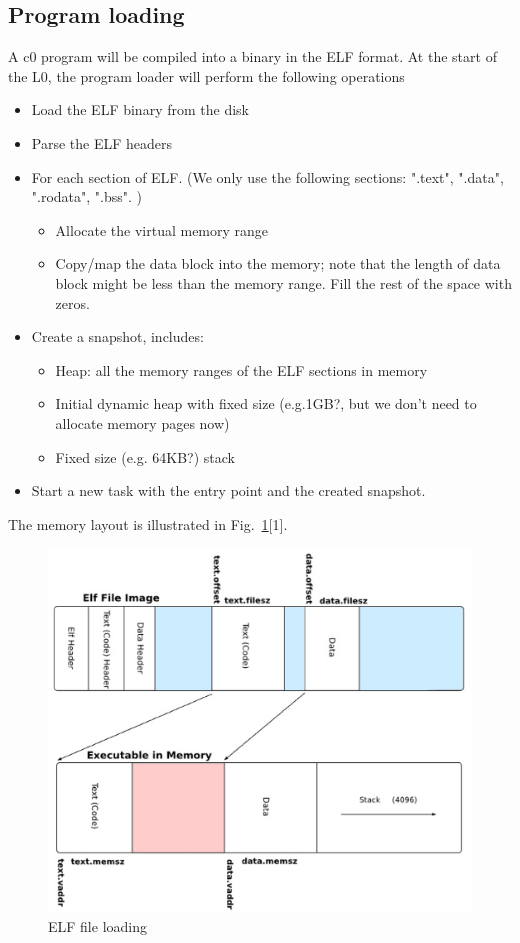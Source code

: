 \documentclass[a4paper]{article}
\begin{document}
{\subsection{Program loading}}

A c0 program will be compiled into a binary in the ELF format.
At the start of the L0, the program loader will perform the following operations

\begin{itemize}
	\item Load the ELF binary from the disk
	\item Parse the ELF headers
	\item For each section of ELF. (We only use the following sections: ".text", ".data", ".rodata", ".bss". )
		\begin{itemize}
			\item Allocate the virtual memory range
			\item Copy/map the data block into the memory; note that the length of data block might be less than the memory range. Fill the rest of the space with zeros.
		\end{itemize}
	\item Create a snapshot, includes:
		\begin{itemize}
			\item Heap: all the memory ranges of the ELF sections in memory
			\item Initial dynamic heap with fixed size (e.g.1GB?, but we don't need to allocate memory pages now)
			\item Fixed size (e.g. 64KB?) stack
		\end{itemize}
	\item Start a new task with the entry point and the created snapshot.
\end{itemize}
The memory layout is illustrated in Fig.~\ref{fig:c0-elf}[1].\\
\begin{figure}[htbp]
\begin{center}
  \includegraphics[width=14cm]{figure/elf.eps}
  \caption{ELF file loading}
  \label{fig:c0-elf}
\end{center}
\end{figure}
\end{document}
